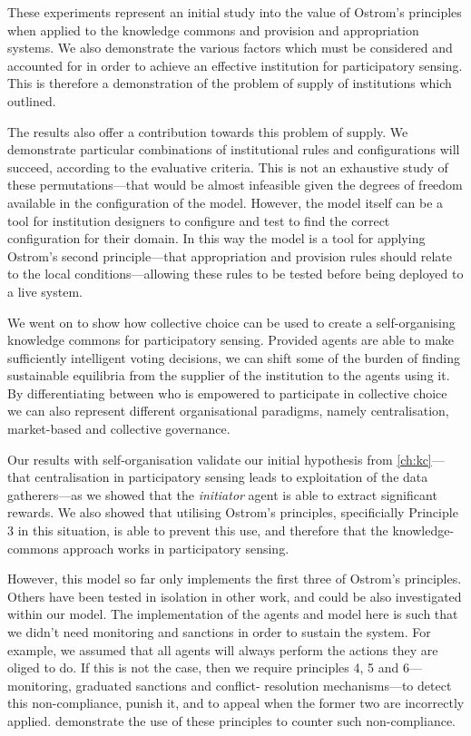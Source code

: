 These experiments represent an initial study into the value of Ostrom's
principles when applied to the knowledge commons and provision and
appropriation systems. We also demonstrate the various factors which must be
considered and accounted for in order to achieve an effective institution for
participatory sensing. This is therefore a demonstration of the problem of
supply of institutions which \citet{Ostrom1990} outlined.

The results also offer a contribution towards this problem of supply. We
demonstrate particular combinations of institutional rules and configurations
will succeed, according to the evaluative criteria. This is not an exhaustive
study of these permutations---that would be almost infeasible given the degrees of
freedom available in the configuration of the model. However, the model itself
can be a tool for institution designers to configure and test to find the
correct configuration for their domain. In this way the model is a tool for
applying Ostrom's second principle---that appropriation and provision rules
should relate to the local conditions---allowing these rules to be tested
before being deployed to a live system.

We went on to show how collective choice can be used to create a 
self-organising knowledge commons for participatory sensing. Provided agents are
able to make sufficiently intelligent voting decisions, we can shift some of
the burden of finding sustainable equilibria from the supplier of the
institution to the agents using it. By differentiating between who is
empowered to participate in collective choice we can also represent different
organisational paradigms, namely centralisation, market-based and collective
governance.

Our results with self-organisation validate our initial hypothesis from
\autoref{ch:kc}---that centralisation in participatory sensing leads to
exploitation of the data gatherers---as we showed that the \emph{initiator}
agent is able to extract significant rewards. We also showed that utilising
Ostrom's principles, specificially Principle 3 in this situation, is able to
prevent this use, and therefore that the knowledge-commons approach works in
participatory sensing.

However, this model so far only implements the first three of Ostrom's
principles. Others have been tested in isolation in other work, and
could be also investigated within our model. The implementation of the agents
and model here is such that we didn't need monitoring and sanctions in order
to sustain the system. For example, we assumed that all agents will always
perform the actions they are oliged to do. If this is not the case, then we
require principles 4, 5 and 6---monitoring, graduated sanctions and conflict-
resolution mechanisms---to detect this non-compliance, punish it, and to
appeal when the former two are incorrectly applied. \citet{Pitt2012b}
demonstrate the use of these principles to counter such non-compliance.

